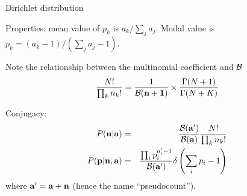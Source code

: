 \documentclass{beamer}
\begin{document}
\begin{frame}{Dirichlet distribution}

\itemb
\item Properties: mean value of $p_k$ is $a_k / \sum_j a_j$. Modal value is $p_k = (a_k-1) / (\sum_j a_j-1)$.
 \item Note the relationship between the multinomial coefficient and ${\cal B}$
\[
\frac{N!}{\prod_k n_k!} = \frac{1}{{\cal B}({\bf n}+{\bf 1})} \times \frac{\Gamma(N+1)}{\Gamma(N+K)}
\]
 \item Conjugacy:
\begin{eqnarray*}
P({\bf n}|{\bf a}) & = & \frac{{\cal B}({\bf a}')}{{\cal B}({\bf a})} \frac{N!}{\prod_k n_k!}  \\
P({\bf p}|{\bf n},{\bf a}) & = & \frac{\prod_i p_i^{a'_i-1}}{{\cal B}({\bf a}')} \delta \left( \sum_i p_i - 1 \right)
\end{eqnarray*}
where ${\bf a}' = {\bf a} + {\bf n}$ (hence the name ``pseudocount'').

\end{frame}
\end{document}
